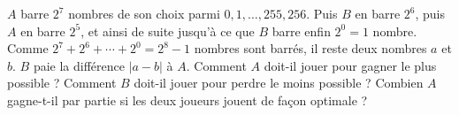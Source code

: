 $A$ barre $2^7$ nombres de son choix parmi $0, 1, \ldots, 255, 256$. Puis $B$ en barre $2^6$, puis $A$ en barre $2^5$, et ainsi de suite jusqu'à ce que $B$ barre enfin $2^0 = 1$ nombre. Comme $2^7 + 2^6 + \cdots + 2^0 = 2^8 - 1$ nombres sont barrés, il reste deux nombres $a$ et $b$. $B$ paie la différence $|a - b|$ à $A$. Comment $A$ doit-il jouer pour gagner le plus possible ? Comment $B$ doit-il jouer pour perdre le moins possible ? Combien $A$ gagne-t-il par partie si les deux joueurs jouent de façon optimale ?
